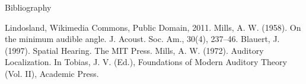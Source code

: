 \documentclass{beamer}
\begin{document}
\begin{frame}{Bibliography}

    \ft
    \begin{thebibliography}{36}
            Lindosland, Wikimedia Commons, Public Domain, 2011.
            Mills, A. W. (1958). On the minimum audible angle. J. Acoust. Soc.
            Am., 30(4), 237--46.
            Blauert, J. (1997). Spatial Hearing. The MIT Press.
            Mills, A. W. (1972). Auditory Localization. In Tobias, J. V. (Ed.),
            Foundations of Modern Auditory Theory (Vol. II), Academic Press.
    \end{thebibliography}
           
\end{frame}
\end{document}
